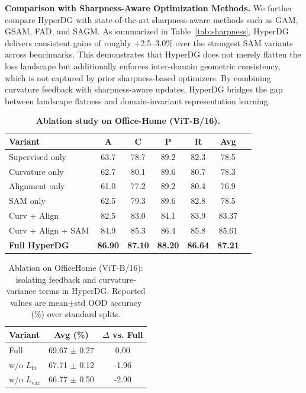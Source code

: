 \documentclass[10pt]{article} %
\begin{document}
\textbf{Comparison with Sharpness-Aware Optimization Methods.}
We further compare HyperDG with state-of-the-art sharpness-aware methods such as GAM, GSAM, FAD, and SAGM. As summarized in Table~\ref{tab:sharpness}, HyperDG delivers consistent gains of roughly +2.5–3.0\% over the strongest SAM variants across benchmarks. This demonstrates that HyperDG does not merely flatten the loss landscape but additionally enforces inter-domain geometric consistency, which is not captured by prior sharpness-based optimizers. By combining curvature feedback with sharpness-aware updates, HyperDG bridges the gap between landscape flatness and domain-invariant representation learning.


\begin{table}[t]

\centering
\caption{\textbf{Ablation study on Office-Home (ViT-B/16).}}
\label{tab:abl_officehome}
\setlength{\tabcolsep}{3pt}
\renewcommand{\arraystretch}{0.92}
\begin{tabular}{lcccccc}
\toprule
\textbf{Variant} & A & C & P & R & Avg \\
\midrule
Supervised only            & 63.7 & 78.7 & 89.2 & 82.3 & 78.5 \\
Curvature only             & 62.7 & 80.1 & 89.6 & 80.7 & 78.3 \\
Alignment only             & 61.0 & 77.2 & 89.2 & 80.4 & 76.9 \\
SAM only                   & 62.5 & 79.3 & 89.6 & 82.8 & 78.5 \\
Curv + Align               & 82.5 & 83.0 & 84.1 & 83.9 & 83.37 \\
Curv + Align + SAM         & 84.9 & 85.3 & 86.4 & 85.8 & 85.61 \\
\textbf{Full HyperDG}      & \textbf{86.90} & \textbf{87.10} & \textbf{88.20} & \textbf{86.64} & \textbf{87.21} \\
\bottomrule
\end{tabular}
\end{table}

\begin{table}[t]
\centering
\caption{Ablation on OfficeHome (ViT-B/16): isolating feedback and curvature-variance terms in HyperDG. Reported values are mean$\pm$std OOD accuracy (\%) over standard splits.}
\label{tab:ablation_lfb_lvar}
\begin{tabular}{lcc}
\toprule
Variant & Avg (\%) & $\Delta$ vs. Full \\
\midrule
Full & 69.67 $\pm$ 0.27 & 0.00 \\
w/o $L_{\mathrm{fb}}$ & 67.71 $\pm$ 0.12 & -1.96 \\
w/o $L_{\mathrm{var}}$ & 66.77 $\pm$ 0.50 & -2.90 \\
\bottomrule
\end{tabular}
\end{table}
\end{document}
